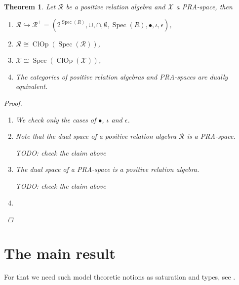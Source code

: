 \documentclass[a4paper]{article}
\theoremstyle{defin}
\theoremstyle{theorem}
\newtheorem{theorem}{Theorem}
\theoremstyle{claim}
\theoremstyle{prop}
\theoremstyle{lemma}
\theoremstyle{fact}
\theoremstyle{ex}
\theoremstyle{col}
\begin{document}
\begin{theorem} Let $\mathcal{R}$ be a positive relation algebra and $\mathcal{X}$ a PRA-space, then

\begin{enumerate}
\item $\mathcal{R} \hookrightarrow \mathcal{R}^{+} = (2^{\operatorname{Spec}(R)}, \cup, \cap, \emptyset, \operatorname{Spec}(R), \bullet, \iota, \epsilon)$,
\item $\mathcal{R} \cong \operatorname{ClOp}(\operatorname{Spec}(\mathcal{R}))$,
\item $\mathcal{X} \cong \operatorname{Spec}(\operatorname{ClOp}(\mathcal{X}))$,
\item The categories of positive relation algebras and PRA-spaces are dually equivalent.
\end{enumerate}

\begin{proof} $ $

\begin{enumerate}
\item We check only the cases of $\bullet$, $\iota$ and $\epsilon$.
\item Note that the dual space of a positive relation algebra $\mathcal{R}$ is a PRA-space.

TODO: check the claim above

\item The dual space of a PRA-space is a positive relation algebra.

TODO: check the claim above

\item
\end{enumerate}
\end{proof}

\end{theorem}



\section{The main result}

For that we need such model theoretic notions as saturation and types, see \cite[Section 6.3]{hodges1993model}.
\end{document}
